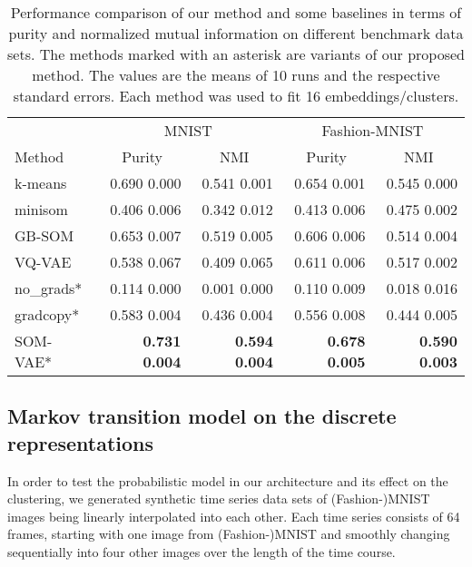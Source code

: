 \documentclass{article}
\begin{document}
\begin{table}
    \centering
    \caption{Performance comparison of our method and some baselines in terms of purity and normalized mutual information on different benchmark data sets. The methods marked with an asterisk are variants of our proposed method. The values are the means of 10 runs and the respective standard errors. Each method was used to fit 16 embeddings/clusters.}
    \begin{tabular}{lrrrr}
        \toprule
         & \multicolumn{2}{c}{MNIST} & \multicolumn{2}{c}{Fashion-MNIST} \\
        \cmidrule(rl){2-3}
        \cmidrule(rl){4-5}
        Method & \multicolumn{1}{c}{Purity} & \multicolumn{1}{c}{NMI} & \multicolumn{1}{c}{Purity} & \multicolumn{1}{c}{NMI} \\
         \midrule
         k-means & 0.690  0.000 & 0.541  0.001 & 0.654  0.001 & 0.545  0.000 \\
         minisom & 0.406  0.006 & 0.342  0.012 & 0.413  0.006 & 0.475  0.002 \\
         GB-SOM & 0.653  0.007 & 0.519  0.005 & 0.606  0.006 & 0.514  0.004 \\
         VQ-VAE & 0.538  0.067 & 0.409  0.065 & 0.611  0.006 & 0.517  0.002 \\
         no\_grads* & 0.114  0.000 & 0.001  0.000 & 0.110  0.009 & 0.018  0.016 \\
         gradcopy* & 0.583  0.004 & 0.436  0.004 & 0.556  0.008 & 0.444  0.005 \\
         SOM-VAE* & \textbf{0.731  0.004} & \textbf{0.594  0.004} & \textbf{0.678  0.005} & \textbf{0.590  0.003} \\
         \bottomrule
    \end{tabular}
    \label{tab:performance}
\end{table}

\FloatBarrier

\subsection{Markov transition model on the discrete representations}

In order to test the probabilistic model in our architecture and its effect on the clustering, we generated synthetic time series data sets of (Fashion-)MNIST images being linearly interpolated into each other.
Each time series consists of 64 frames, starting with one image from \mbox{(Fashion-)MNIST} and smoothly changing sequentially into four other images over the length of the time course.
\end{document}
